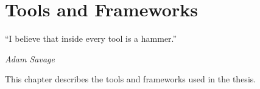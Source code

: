\chapter{Tools and Frameworks}
\label{c:tools}

\epigraph{\enquote{I believe that inside every tool is a hammer.}}{\emph{Adam Savage}}

This chapter describes the tools and frameworks used in the thesis.
